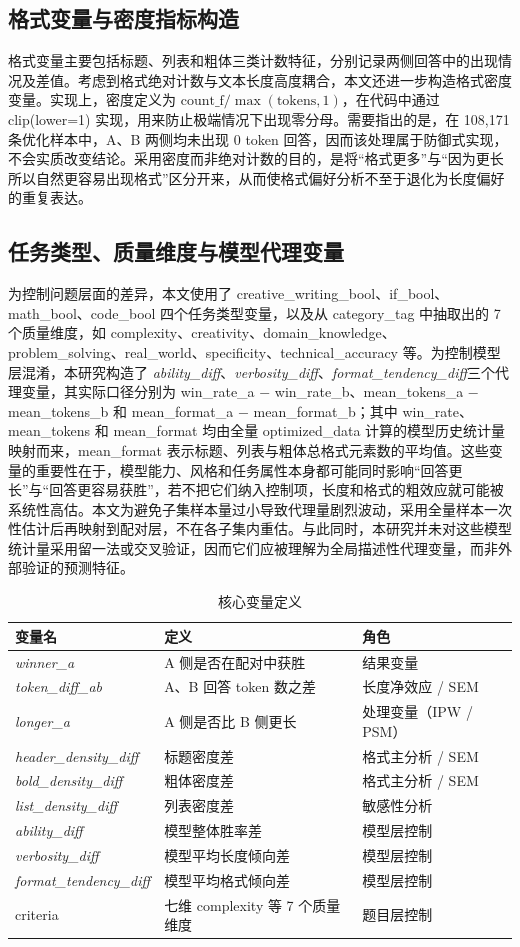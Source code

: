 \documentclass[9pt,a4paper,fontset=windows]{ctexart}
\theoremstyle{definition}
\numberwithin{equation}{section}
\newcommand{\winner}{\textit{winner\_a}}
\newcommand{\tokendiff}{\textit{token\_diff\_ab}}
\newcommand{\headerD}{\textit{header\_density\_diff}}
\newcommand{\boldD}{\textit{bold\_density\_diff}}
\newcommand{\listD}{\textit{list\_density\_diff}}
\newcommand{\ability}{\textit{ability\_diff}}
\newcommand{\verbosity}{\textit{verbosity\_diff}}
\newcommand{\formatt}{\textit{format\_tendency\_diff}}
\newcommand{\longer}{\textit{longer\_a}}
\begin{document}
\subsection{格式变量与密度指标构造}
格式变量主要包括标题、列表和粗体三类计数特征，分别记录两侧回答中的出现情况及差值。考虑到格式绝对计数与文本长度高度耦合，本文还进一步构造格式密度变量。实现上，密度定义为 \(\text{count\_f} / \max(\text{tokens},1)\)，在代码中通过 clip(lower=1) 实现，用来防止极端情况下出现零分母。需要指出的是，在 108,171 条优化样本中，A、B 两侧均未出现 0 token 回答，因而该处理属于防御式实现，不会实质改变结论。采用密度而非绝对计数的目的，是将“格式更多”与“因为更长所以自然更容易出现格式”区分开来，从而使格式偏好分析不至于退化为长度偏好的重复表达。

\subsection{任务类型、质量维度与模型代理变量}
为控制问题层面的差异，本文使用了 creative\_writing\_bool、if\_bool、math\_bool、code\_bool 四个任务类型变量，以及从 category\_tag 中抽取出的 7 个质量维度，如 complexity、creativity、domain\_knowledge、problem\_solving、real\_world、specificity、technical\_accuracy 等。为控制模型层混淆，本研究构造了 \ability、\verbosity、\formatt 三个代理变量，其实际口径分别为 win\_rate\_a \(-\) win\_rate\_b、mean\_tokens\_a \(-\) mean\_tokens\_b 和 mean\_format\_a \(-\) mean\_format\_b；其中 win\_rate、mean\_tokens 和 mean\_format 均由全量 optimized\_data 计算的模型历史统计量映射而来，mean\_format 表示标题、列表与粗体总格式元素数的平均值。这些变量的重要性在于，模型能力、风格和任务属性本身都可能同时影响“回答更长”与“回答更容易获胜”，若不把它们纳入控制项，长度和格式的粗效应就可能被系统性高估。本文为避免子集样本量过小导致代理量剧烈波动，采用全量样本一次性估计后再映射到配对层，不在各子集内重估。与此同时，本研究并未对这些模型统计量采用留一法或交叉验证，因而它们应被理解为全局描述性代理变量，而非外部验证的预测特征。

\begin{table}[htbp]
\centering
\caption{核心变量定义}
\label{tab:variables}
\begin{tabular}{lll}
\toprule
变量名 & 定义 & 角色 \\
\midrule
\winner & A 侧是否在配对中获胜 & 结果变量 \\
\tokendiff & A、B 回答 token 数之差 & 长度净效应 / SEM \\
\longer & A 侧是否比 B 侧更长 & 处理变量（IPW / PSM） \\
\headerD & 标题密度差 & 格式主分析 / SEM \\
\boldD & 粗体密度差 & 格式主分析 / SEM \\
\listD & 列表密度差 & 敏感性分析 \\
\ability & 模型整体胜率差 & 模型层控制 \\
\verbosity & 模型平均长度倾向差 & 模型层控制 \\
\formatt & 模型平均格式倾向差 & 模型层控制 \\
criteria & 七维 complexity 等 7 个质量维度 & 题目层控制 \\
\bottomrule
\end{tabular}
\end{table}
\end{document}
